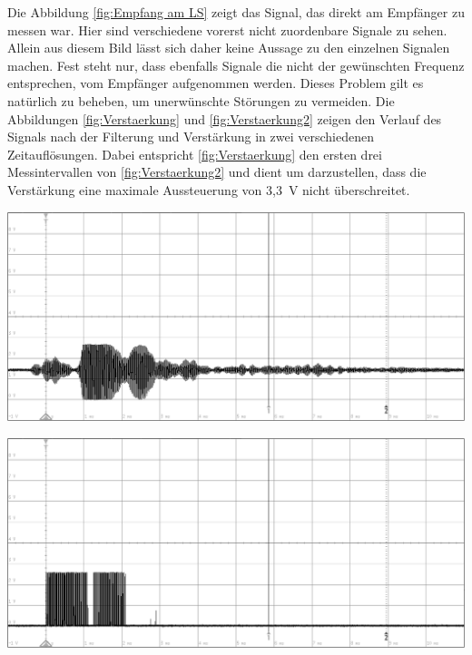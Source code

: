 Die Abbildung \ref{fig:Empfang am LS} zeigt das Signal, das direkt am Empfänger zu messen war. Hier sind verschiedene vorerst nicht zuordenbare Signale zu sehen. Allein aus diesem Bild lässt sich daher keine Aussage zu den einzelnen Signalen machen. Fest steht nur, dass ebenfalls Signale die nicht der gewünschten Frequenz entsprechen, vom Empfänger aufgenommen werden. Dieses Problem gilt es natürlich zu beheben, um unerwünschte Störungen zu vermeiden.
Die Abbildungen \ref{fig:Verstaerkung} und \ref{fig:Verstaerkung2} zeigen den Verlauf des Signals nach der Filterung und Verstärkung in zwei verschiedenen Zeitauflösungen. Dabei entspricht \ref{fig:Verstaerkung} den ersten drei Messintervallen von \ref{fig:Verstaerkung2} und dient um darzustellen, dass die Verstärkung eine maximale Aussteuerung von 3,3~V nicht überschreitet.\\
\begin{minipage}{0.46\textwidth}
\includegraphics[width=1\textwidth%
]{Abbildungen/MessungenP1/Signal-nach-Verstarkung2.png}
\label{fig:Verstaerkung2}
\end{minipage}\qquad
\begin{minipage}{0.46\textwidth}
\includegraphics[width=1\textwidth%
]{Abbildungen/MessungenP1/Signal-nach-Komparator.png}
\label{fig:Komparator}
\end{minipage}\\
